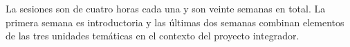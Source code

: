 La sesiones son de cuatro horas cada una y son veinte semanas en
total. La primera semana es introductoria y las \'{u}ltimas dos semanas
combinan elementos de las tres unidades tem\'{a}ticas en el contexto del
proyecto integrador.
